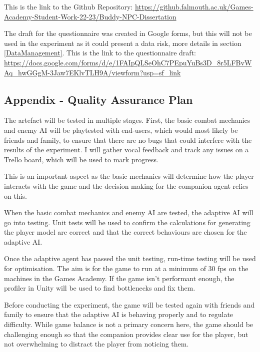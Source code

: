 \documentclass{IEEEtran}
\begin{document}
This is the link to the Github Repository: \url{https://github.falmouth.ac.uk/Games-Academy-Student-Work-22-23/Buddy-NPC-Dissertation}

The draft for the questionnaire was created in Google forms, but this will not be used in the experiment as it could present a data risk, more details in section \ref{DataManagement}. This is the link to the questionnaire draft: \url{https://docs.google.com/forms/d/e/1FAIpQLSeOhC7PEpuYuBs3D_8r5LFBvWAq_hwGGgM-3Jaw7EKlvTLH9A/viewform?usp=sf_link}


\subsection{Appendix - Quality Assurance Plan}
\label{AppendixQAPlan}


The artefact will be tested in multiple stages. First, the basic combat mechanics and enemy AI will be playtested with end-users, which would most likely be friends and family, to ensure that there are no bugs that could interfere with the results of the experiment. I will gather vocal feedback and track any issues on a Trello board, which will be used to mark progress.

This is an important aspect as the basic mechanics will determine how the player interacts with the game and the decision making for the companion agent relies on this.

When the basic combat mechanics and enemy AI are tested, the adaptive AI will go into testing. Unit tests will be used to confirm the calculations for generating the player model are correct and that the correct behaviours are chosen for the adaptive AI.

Once the adaptive agent has passed the unit testing, run-time testing will be used for optimisation. The aim is for the game to run at a minimum of 30 fps on the machines in the Games Academy. If the game isn't performant enough, the profiler in Unity will be used to find bottlenecks and fix them.

Before conducting the experiment, the game will be tested again with friends and family to ensure that the adaptive AI is behaving properly and to regulate difficulty. While game balance is not a primary concern here, the game should be challenging enough so that the companion provides clear use for the player, but not overwhelming to distract the player from noticing them.
\end{document}
